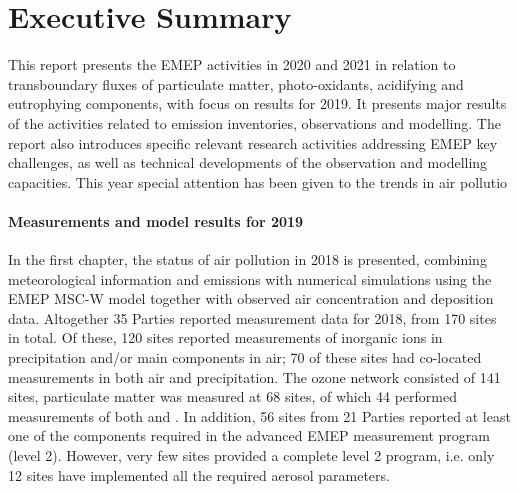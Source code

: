 \chapter*{Executive Summary}


This report presents the EMEP activities in 2020 and 2021 in relation to transboundary
fluxes of particulate matter, photo-oxidants, acidifying and
eutrophying components, with focus on results
for 2019. It presents major results of the activities related to
emission inventories, observations and modelling. The report also
introduces specific relevant research activities addressing EMEP key
challenges, as well as technical developments of the observation and
modelling capacities. This year special attention has been given to the trends in air pollutio

\subsubsection*{Measurements and model results for 2019} %
In the first chapter, the status of air pollution in 2018 is presented, combining 
meteorological information and emissions with numerical simulations using the EMEP MSC-W model together with observed air concentration and deposition data.
Altogether 35 Parties reported measurement data for 2018, from 170 sites in total. 
Of these, 120 sites reported measurements of inorganic ions in precipitation and/or 
main components in air; 70 of these sites had co-located measurements in both air and 
precipitation. The ozone network consisted of 141 sites, particulate matter was measured at 
68 sites, of which 44 performed measurements of both \PM[10] and \PM[2.5]. 
In addition, 56 sites from 21 Parties reported at least one of the components required in the advanced EMEP measurement program (level 2). However, very few sites provided a complete level 2 program, i.e. only 12 sites have implemented all the required aerosol parameters. 

